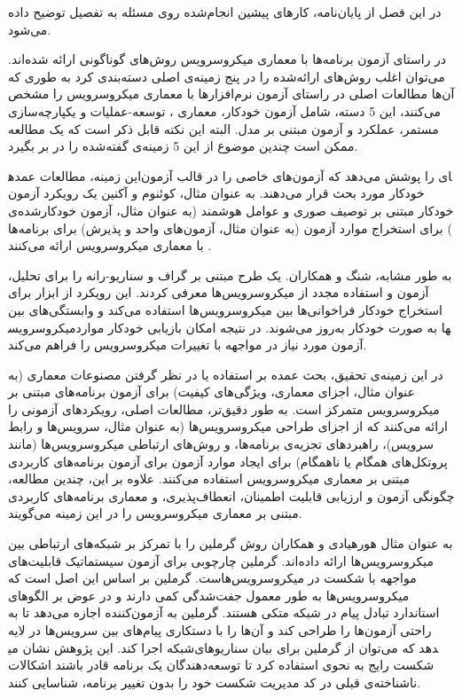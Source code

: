 

در این فصل از پایان‌نامه، کارهای پیشین انجام‌شده روی مسئله به تفصیل توضیح داده می‌شود.



در راستای آزمون برنامه‌ها با معماری میکروسرویس‌ روش‌های گوناگونی ارائه‌ شده‌اند. می‌توان اغلب روش‌های ارائه‌شده را در پنج زمینه‌ی اصلی دسته‌بندی کرد به طوری که آن‌ها مطالعات اصلی در راستای آزمون نرم‌افزارها با معماری میکروسرویس را مشخص می‌کنند، این 5 دسته، شامل آزمون خودکار، معماری ، توسعه-عملیات و  یکپارچه‌سازی مستمر، عملکرد و آزمون مبتنی بر مدل. البته این نکته قابل ذکر است که یک مطالعه ممکن است چندین موضوع از این 5 زمینه‌ی گفته‌شده را در بر بگیرد.

این زمینه، مطالعات عمده‎ای را پوشش می‌دهد که آزمون‌های خاصی را در قالب آزمون خودکار مورد بحث قرار می‌دهند. به عنوان مثال، کوئنوم و آکنین یک رویکرد آزمون خودکار مبتنی بر توصیف صوری و عوامل هوشمند (به عنوان مثال، آزمون خودکارشده‌ی ) برای استخراج موارد آزمون (به عنوان مثال، آزمون‌های واحد و پذیرش) برای برنامه‌ها با معماری میکروسرویس ارائه می‌کنند . 

به طور مشابه، شنگ و همکاران. یک طرح مبتنی بر گراف و سناریو-رانه را برای تحلیل، آزمون و استفاده مجدد از میکروسرویس‌ها معرفی کردند. این رویکرد از ابزار  برای استخراج خودکار فراخوانی‌ها بین میکروسرویس‌ها استفاده می‌کند و وابستگی‌های بین میکروسرویس‎ها به صورت خودکار به‌روز می‌شوند. در نتیجه امکان بازیابی خودکار موارد آزمون مورد نیاز در مواجهه با تغییرات میکروسرویس را فراهم می‌کند. 

در این زمینه‌ی تحقیق، بحث عمده بر استفاده یا در نظر گرفتن مصنوعات معماری (به عنوان مثال، اجزای معماری، ویژگی‌های کیفیت) برای آزمون برنامه‌های مبتنی بر میکروسرویس متمرکز است. به طور دقیق‌تر، مطالعات اصلی، رویکردهای آزمونی را ارائه می‌کنند که از اجزای طراحی میکروسرویس‌ها (به عنوان مثال، سرویس‌ها و رابط سرویس)، راهبردهای تجزیه‌ی برنامه‌ها، و روش‌های ارتباطی میکروسرویس‌ها (مانند پروتکل‌های همگام یا ناهمگام) برای ایجاد موارد آزمون برای آزمون برنامه‌های کاربردی مبتنی بر معماری میکروسرویس استفاده می‌کنند. علاوه بر این، چندین مطالعه، چگونگی آزمون و ارزیابی قابلیت اطمینان، انعطاف‌پذیری، و معماری برنامه‌های کاربردی مبتنی بر معماری میکروسرویس را در این زمینه می‌گویند.

به عنوان مثال هورهیادی و همکاران روش گرملین را با تمرکز بر شبکه‌های ارتباطی بین میکروسرویس‌ها ارائه داده‌اند. گرملین چارچوبی برای آزمون سیستماتیک قابلیت‌های مواجهه با  شکست در میکروسرویس‌هاست. گرملین بر اساس این اصل است که میکروسرویس‌ها به طور معمول جفت‌شدگی کمی دارند و در عوض بر الگوهای استاندارد تبادل پیام در شبکه متکی هستند. گرملین به آزمون‌کننده اجازه می‌دهد تا به راحتی آزمون‌ها را طراحی کند و آن‌ها را با دستکاری پیام‌های بین سرویس‌ها در لایه شبکه اجرا کند. این پژوهش نشان می‎دهد که می‌توان از گرملین برای بیان سناریوهای شکست رایج به نحوی استفاده کرد تا توسعه‌دهندگان یک برنامه قادر باشند اشکالات ناشناخته‌ی قبلی در کد مدیریت شکست خود را بدون تغییر برنامه، شناسایی کنند.


